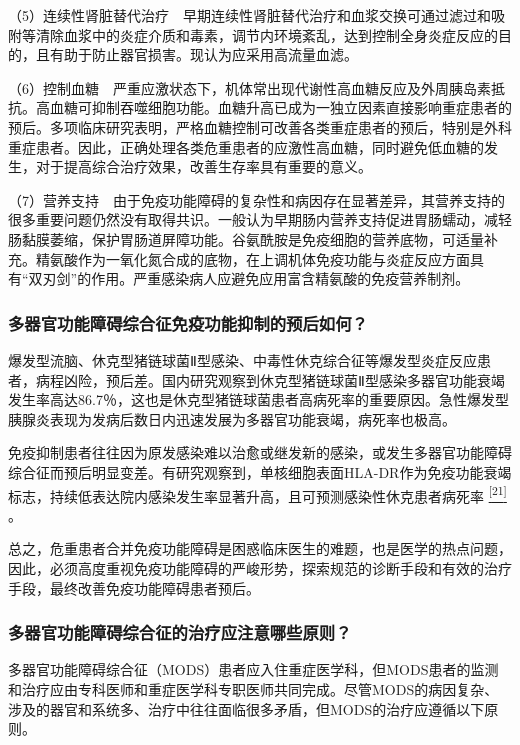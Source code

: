 （5）连续性肾脏替代治疗　早期连续性肾脏替代治疗和血浆交换可通过滤过和吸附等清除血浆中的炎症介质和毒素，调节内环境紊乱，达到控制全身炎症反应的目的，且有助于防止器官损害。现认为应采用高流量血滤。

（6）控制血糖　严重应激状态下，机体常出现代谢性高血糖反应及外周胰岛素抵抗。高血糖可抑制吞噬细胞功能。血糖升高已成为一独立因素直接影响重症患者的预后。多项临床研究表明，严格血糖控制可改善各类重症患者的预后，特别是外科重症患者。因此，正确处理各类危重患者的应激性高血糖，同时避免低血糖的发生，对于提高综合治疗效果，改善生存率具有重要的意义。

（7）营养支持　由于免疫功能障碍的复杂性和病因存在显著差异，其营养支持的很多重要问题仍然没有取得共识。一般认为早期肠内营养支持促进胃肠蠕动，减轻肠黏膜萎缩，保护胃肠道屏障功能。谷氨酰胺是免疫细胞的营养底物，可适量补充。精氨酸作为一氧化氮合成的底物，在上调机体免疫功能与炎症反应方面具有“双刃剑”的作用。严重感染病人应避免应用富含精氨酸的免疫营养制剂。

\subsubsection{多器官功能障碍综合征免疫功能抑制的预后如何？}

爆发型流脑、休克型猪链球菌Ⅱ型感染、中毒性休克综合征等爆发型炎症反应患者，病程凶险，预后差。国内研究观察到休克型猪链球菌Ⅱ型感染多器官功能衰竭发生率高达86.7％，这也是休克型猪链球菌患者高病死率的重要原因。急性爆发型胰腺炎表现为发病后数日内迅速发展为多器官功能衰竭，病死率也极高。

免疫抑制患者往往因为原发感染难以治愈或继发新的感染，或发生多器官功能障碍综合征而预后明显变差。有研究观察到，单核细胞表面HLA-DR作为免疫功能衰竭标志，持续低表达院内感染发生率显著升高，且可预测感染性休克患者病死率
\protect\hyperlink{text00007.htmlux5cux23ch21-6}{\textsuperscript{{[}21{]}}}
。

总之，危重患者合并免疫功能障碍是困惑临床医生的难题，也是医学的热点问题，因此，必须高度重视免疫功能障碍的严峻形势，探索规范的诊断手段和有效的治疗手段，最终改善免疫功能障碍患者预后。

\subsubsection{多器官功能障碍综合征的治疗应注意哪些原则？}

多器官功能障碍综合征（MODS）患者应入住重症医学科，但MODS患者的监测和治疗应由专科医师和重症医学科专职医师共同完成。尽管MODS的病因复杂、涉及的器官和系统多、治疗中往往面临很多矛盾，但MODS的治疗应遵循以下原则。

